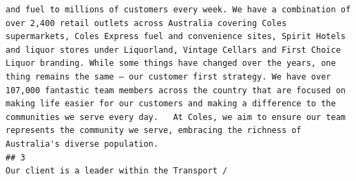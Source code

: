 \documentclass[11pt,a4paper,]{article}
\begin{document}
\begin{verbatim}
and fuel to millions of customers every week. We have a combination of over 2,400 retail outlets across Australia covering Coles supermarkets, Coles Express fuel and convenience sites, Spirit Hotels and liquor stores under Liquorland, Vintage Cellars and First Choice Liquor branding. While some things have changed over the years, one thing remains the same – our customer first strategy. We have over 107,000 fantastic team members across the country that are focused on making life easier for our customers and making a difference to the communities we serve every day.   At Coles, we aim to ensure our team represents the community we serve, embracing the richness of Australia's diverse population.  
## 3                                                                                                                                                                                                                                                                                                                                                                                                                                                                                                                                                                                                                                                                                                                                                                                                                                                                                                                                                                                                                                                                                                                                                                                                                                                                                                                                                                                                                                                                                                                                                                                                                                                                                                                                                                                                                                                                                                                                                                                                                                                                                                                                                                                                                                                                                                                                                                                                                                                                                                                                                                                                                                                         Our client is a leader within the Transport / 
\end{verbatim}
\end{document}
